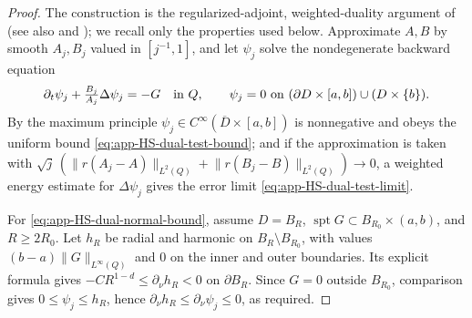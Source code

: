 \documentclass[11pt]{amsart}
\numberwithin{equation}{section}
\numberwithin{figure}{section}
\theoremstyle{plain}
\theoremstyle{definition}
\theoremstyle{remark}
\theoremstyle{plain}
\newcommand{\norm}[1]{\lVert #1 \rVert}
\newcommand{\supp}{\operatorname{spt}}
\begin{document}
\begin{proof}

The construction is the regularized-adjoint, weighted-duality argument of
\cite[\S\S3,5]{PQV14} (see also
\cite[Prop.~5.1]{GKM22} and \cite[App.~A]{JKT23}); we recall only the properties
used below.  Approximate \(A,B\) by smooth \(A_j,B_j\) valued in \([j^{-1},1]\),
and let \(\psi_j\) solve the nondegenerate backward equation
\begin{equation}\label{eq:app-HS-regularized-adjoint}
    \partial_t\psi_j+\tfrac{B_j}{A_j}\Delta\psi_j=-G
    \quad\hbox{in }Q,\qquad
    \psi_j=0\hbox{ on }(\partial D\times[a,b])\cup(D\times\{b\}).
\end{equation}
By the maximum principle \(\psi_j\in C^\infty(\overline D\times[a,b])\) is
nonnegative and obeys the uniform bound \eqref{eq:app-HS-dual-test-bound}; and if
the approximation is taken with
\(\sqrt j\,(\norm{r(A_j-A)}_{L^2(Q)}+\norm{r(B_j-B)}_{L^2(Q)})\to0\), a weighted
energy estimate for \(\Delta\psi_j\) gives the error limit
\eqref{eq:app-HS-dual-test-limit}.

For \eqref{eq:app-HS-dual-normal-bound}, assume \(D=B_R\),
\(\supp G\subset B_{R_0}\times(a,b)\), and \(R\geq2R_0\). Let \(h_R\) be radial
and harmonic on \(B_R\setminus B_{R_0}\), with values
\((b-a)\norm{G}_{L^\infty(Q)}\) and \(0\) on the inner and outer boundaries.
Its explicit formula gives \(-CR^{1-d}\leq\partial_\nu h_R<0\) on
\(\partial B_R\). Since \(G=0\) outside \(B_{R_0}\), comparison gives
\(0\leq\psi_j\leq h_R\), hence
\(\partial_\nu h_R\leq\partial_\nu\psi_j\leq0\), as required.

\end{proof}
\end{document}
